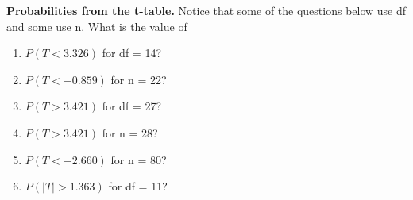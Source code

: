 \item \textbf{Probabilities from the t-table.} Notice that some of the questions below use df and some use n.  What is the value of 
    \begin{enumerate}
     \item  $P(T < 3.326)$ for df = 14?  \ \ \ 
     \item  $P(T < -0.859)$ for n = 22?  \ \ \ 
     \item  $P(T > 3.421)$ for df = 27?  \ \ \ 
     \item  $P(T > 3.421)$ for n = 28?    \ \ \ 
     \item  $P(T < -2.660)$ for n = 80?   \ \ \ 
     \item  $P(|T| > 1.363)$ for df = 11? \ \ \ 
    \end{enumerate}

